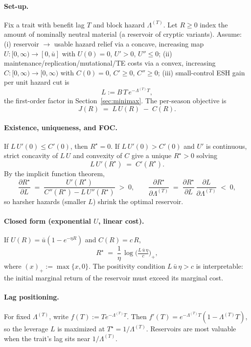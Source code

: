 \documentclass[11pt]{article}
\theoremstyle{upright}
\newcommand{\hazT}[1]{\Lambda^{(#1)}}          %
\begin{document}
\paragraph{Set-up.}
Fix a trait with benefit lag $T$ and block hazard $\hazT{T}$.
Let $R\ge 0$ index the amount of nominally neutral material (a reservoir of cryptic variants).
Assume:
(i) reservoir $\to$ usable hazard relief via a concave, increasing map $U:[0,\infty)\!\to\![0,\bar u]$ with $U(0)=0$, $U'>0$, $U''\le 0$;
(ii) maintenance/replication/mutational/TE costs via a convex, increasing $C:[0,\infty)\!\to\![0,\infty)$ with $C(0)=0$, $C'\!\ge\!0$, $C''\!\ge\!0$;
(iii) small-control ESH gain per unit hazard cut is
\[
L:=B\,T\,e^{-\hazT{T}T},
\]
the first-order factor in Section~\ref{sec:minimax}. The per-season objective is
\[
J(R)\;=\; L\,U(R)\;-\;C(R).
\]

\paragraph{Existence, uniqueness, and FOC.}
If $L\,U'(0)\le C'(0)$, then $R^\star=0$.
If $L\,U'(0)>C'(0)$ and $U'$ is continuous, strict concavity of $L\,U$ and convexity of $C$ give a unique $R^\star\!>\!0$ solving
\begin{equation}\label{eq:FOC-single}
L\,U'(R^\star) \;=\; C'(R^\star).
\end{equation}
By the implicit function theorem,
\[
\frac{\partial R^\star}{\partial L}\;=\;\frac{U'(R^\star)}{C''(R^\star)-L\,U''(R^\star)}\;>\;0,\qquad
\frac{\partial R^\star}{\partial \hazT{T}}\;=\;\frac{\partial R^\star}{\partial L}\,\frac{\partial L}{\partial \hazT{T}}\;<\;0,
\]
so harsher hazards (smaller $L$) shrink the optimal reservoir.

\paragraph{Closed form (exponential $U$, linear cost).}
If $U(R)=\bar u(1-e^{-\eta R})$ and $C(R)=c\,R$,
\[
R^\star \;=\; \frac{1}{\eta}\,\log\!\Big(\tfrac{L\,\bar u\,\eta}{c}\Big)_{+},
\]
where $(x)_{+}:=\max\{x,0\}$. The positivity condition $L\,\bar u\,\eta>c$ is interpretable: the initial marginal return of the reservoir must exceed its marginal cost.

\paragraph{Lag positioning.}
For fixed $\hazT{T}$, write $f(T):=T e^{-\hazT{T}T}$. Then $f'(T)=e^{-\hazT{T}T}\!\left(1-\hazT{T}T\right)$, so the leverage $L$ is maximized at $T^\star=1/\hazT{T}$. Reservoirs are most valuable when the trait’s lag sits near $1/\hazT{T}$.
\end{document}
